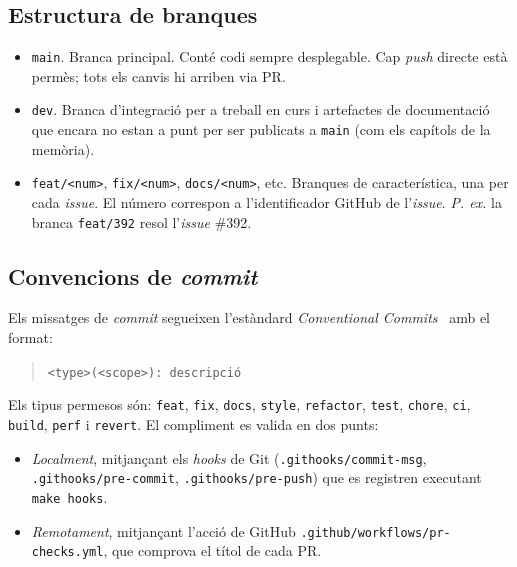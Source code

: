 \subsection{Estructura de branques}
\label{subsec:estructura-de-branques}

\begin{itemize}
    \item \texttt{main}.
    Branca principal.
    Conté codi sempre desplegable.
    Cap \emph{push} directe està permès; tots els canvis hi arriben via \ac{PR}.

    \item \texttt{dev}.
    Branca d'integració per a treball en curs i artefactes de documentació que encara no estan a punt per ser publicats
    a \texttt{main} (com els capítols de la memòria).

    \item \texttt{feat/<num>}, \texttt{fix/<num>}, \texttt{docs/<num>}, etc. Branques de característica, una per cada
    \emph{issue}.
    El número correspon a l'identificador GitHub de l'\emph{issue}.
    \emph{P.
    ex.} la branca \texttt{feat/392} resol l'\emph{issue} \#392.
\end{itemize}

\subsection{Convencions de \emph{commit}}
\label{subsec:convencions-de-commit}

Els missatges de \emph{commit} segueixen l'estàndard \emph{Conventional Commits}~\cite{conventionalcommits} amb el
format:

\begin{quote}
    \texttt{<type>(<scope>): descripció}
\end{quote}

Els tipus permesos són: \texttt{feat}, \texttt{fix}, \texttt{docs}, \texttt{style}, \texttt{refactor}, \texttt{test},
\texttt{chore}, \texttt{ci}, \texttt{build}, \texttt{perf} i \texttt{revert}.
El compliment es valida en dos punts:

\begin{itemize}
    \item \emph{Localment}, mitjançant els \emph{hooks} de Git (\texttt{.githooks/commit-msg},
    \texttt{.githooks/pre-commit}, \texttt{.githooks/pre-push}) que es registren executant \texttt{make hooks}.

    \item \emph{Remotament}, mitjançant l'acció de GitHub \texttt{.github/workflows/pr-checks.yml}, que comprova el
    títol de cada \ac{PR}.
\end{itemize}

